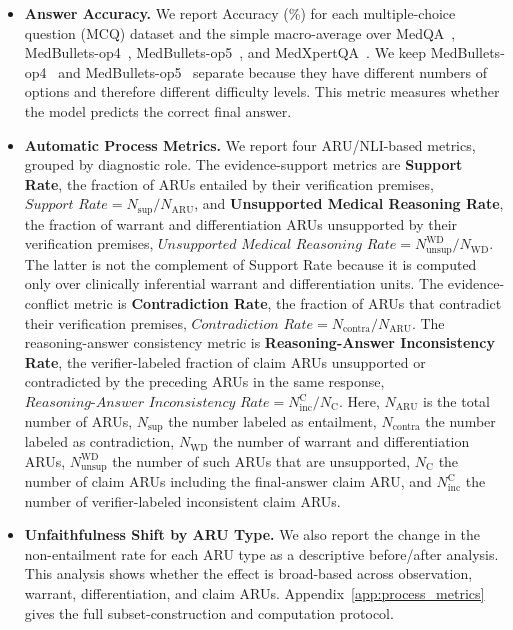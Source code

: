 \documentclass[a4paper,fleqn,doubleblind]{cas-sc}
\begin{document}
\begin{itemize}[leftmargin=*]
    \item \textbf{Answer Accuracy.} We report Accuracy (\%) for each multiple-choice question (MCQ) dataset and the simple macro-average over MedQA~\cite{jin2021disease}, MedBullets-op4~\cite{chen2025benchmarking}, MedBullets-op5~\cite{chen2025benchmarking}, and MedXpertQA~\cite{zuo2025medxpertqa}. We keep MedBullets-op4~\cite{chen2025benchmarking} and MedBullets-op5~\cite{chen2025benchmarking} separate because they have different numbers of options and therefore different difficulty levels. This metric measures whether the model predicts the correct final answer.
    \item \textbf{Automatic Process Metrics.} We report four ARU/NLI-based metrics, grouped by diagnostic role. The evidence-support metrics are \textbf{Support Rate}, the fraction of ARUs entailed by their verification premises, $\textit{Support Rate} = N_{\text{sup}} / N_{\text{ARU}}$, and \textbf{Unsupported Medical Reasoning Rate}, the fraction of warrant and differentiation ARUs unsupported by their verification premises, $\textit{Unsupported Medical Reasoning Rate} = N_{\text{unsup}}^{\text{WD}} / N_{\text{WD}}$. The latter is not the complement of Support Rate because it is computed only over clinically inferential warrant and differentiation units. The evidence-conflict metric is \textbf{Contradiction Rate}, the fraction of ARUs that contradict their verification premises, $\textit{Contradiction Rate} = N_{\text{contra}} / N_{\text{ARU}}$. The reasoning-answer consistency metric is \textbf{Reasoning-Answer Inconsistency Rate}, the verifier-labeled fraction of claim ARUs unsupported or contradicted by the preceding ARUs in the same response, $\textit{Reasoning-Answer Inconsistency Rate} = N_{\text{inc}}^{\text{C}} / N_{\text{C}}$. Here, $N_{\text{ARU}}$ is the total number of ARUs, $N_{\text{sup}}$ the number labeled as entailment, $N_{\text{contra}}$ the number labeled as contradiction, $N_{\text{WD}}$ the number of warrant and differentiation ARUs, $N_{\text{unsup}}^{\text{WD}}$ the number of such ARUs that are unsupported, $N_{\text{C}}$ the number of claim ARUs including the final-answer claim ARU, and $N_{\text{inc}}^{\text{C}}$ the number of verifier-labeled inconsistent claim ARUs.
    \item \textbf{Unfaithfulness Shift by ARU Type.} We also report the change in the non-entailment rate for each ARU type as a descriptive before/after analysis. This analysis shows whether the effect is broad-based across observation, warrant, differentiation, and claim ARUs. Appendix~\ref{app:process_metrics} gives the full subset-construction and computation protocol.
\end{itemize}
\end{document}
